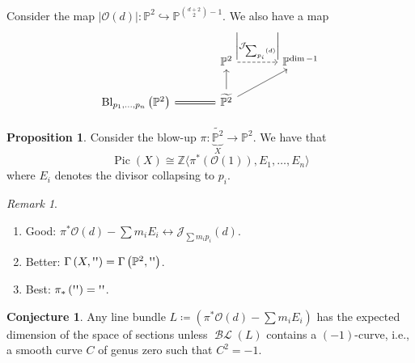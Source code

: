 \documentclass[10pt,letterpaper,cm]{nupset}
\theoremstyle{definition}
\theoremstyle{theorem}
\newtheorem{prop}[defn]{Proposition}
\newtheorem{conj}[defn]{Conjecture}
\theoremstyle{remark}
\newtheorem{remark}[defn]{Remark}
\newcommand{\J}{\mathcal J}
\renewcommand{\O}{\mathcal O}
\renewcommand{\P}{\mathbb P}
\newcommand{\Z}{\mathbb Z}
\newcommand{\1}{\mathbb{1}}
\newcommand{\0}{\vec 0}
\DeclareMathOperator{\pic}{Pic}
\DeclareMathOperator{\BL}{\mathcal{BL}}
\DeclareMathOperator{\bl}{\mathrm{Bl}}
\newcommand{\be}{\begin{enumerate}}
\newcommand{\ee}{\end{enumerate}}
\begin{document}
Consider the map $\left\lvert{\O(d)}\right\rvert : \P^2 \hookrightarrow \P^{{{d+2}\choose 2} -1}$. We also have a map
\[
\begin{tikzcd}[column sep = large]
                                                    & \P^2 \arrow[r, "\left\lvert{\J_{\sum_{p_i}(d)}}\right\rvert", dashed] & \P^{\dim -1} \\
{\bl_{p_1, \ldots, p_n}\left(\P^2\right)} \arrow[r, equals] & \widetilde{\P^2} \arrow[u] \arrow[ru]                      &             
\end{tikzcd}
\]

\begin{prop}
Consider the blow-up $\pi : \underbrace{\widetilde{\P^2}}_{X} \to \P^2$. We have that $$\pic(X) \cong \Z\langle \pi^{\ast}\left(\O(1)\right), E_1, \ldots, E_n\rangle$$ where $E_i$ denotes the divisor collapsing to $p_i$.
\end{prop}

\begin{remark} $ $
\be
\item[Good:] $\pi^{\ast}{\O(d)} - \sum{m_iE_i} \longleftrightarrow \J_{\sum{m_ip_i}}(d)$.
\item[Better:] $\Gamma\left(X, \text{\textquotesingle\textquotesingle}\right) = \Gamma\left(\P^2, \text{\textquotesingle\textquotesingle}\right) $.
\item[Best:] $\pi_{\ast}\left( \text{\textquotesingle\textquotesingle}\right) =  \text{\textquotesingle\textquotesingle}$.
\ee
\end{remark}

\begin{conj}
Any line bundle $L \coloneqq \left(\pi^{\ast}{\O(d)} -\sum{m_iE_i}\right)$ has the expected dimension of the space of sections unless $\BL\left(L\right)$ contains a $\left({-1}\right)$-curve, i.e., a smooth curve $C$ of genus zero  such that $C^2 = {-1}$.
\end{conj}
\end{document}
